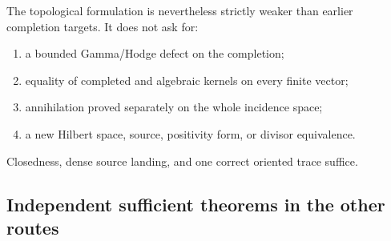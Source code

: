 \documentclass[11pt]{article}
\theoremstyle{definition}
\theoremstyle{remark}
\begin{document}
The topological formulation is nevertheless strictly weaker than earlier
completion targets.  It does not ask for:
\begin{enumerate}[leftmargin=2.2em]
\item a bounded Gamma/Hodge defect on the completion;
\item equality of completed and algebraic kernels on every finite vector;
\item annihilation proved separately on the whole incidence space;
\item a new Hilbert space, source, positivity form, or divisor
      equivalence.
\end{enumerate}
Closedness, dense source landing, and one correct oriented trace suffice.

\subsection{Independent sufficient theorems in the other routes}
\end{document}
